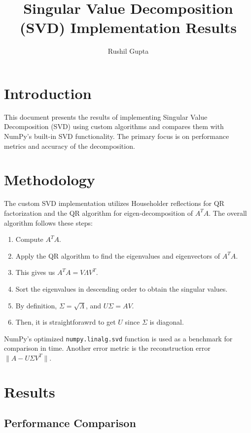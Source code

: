 \documentclass[a4paper, 12pt]{article}
\title{\Large\textbf{Singular Value Decomposition (SVD) Implementation Results}}
\author{Rushil Gupta}
\date{}
\begin{document}
\maketitle

\section*{Introduction}

This document presents the results of implementing Singular Value Decomposition (SVD) using custom algorithms and compares them with NumPy's built-in SVD functionality. The primary focus is on performance metrics and accuracy of the decomposition.

\section*{Methodology}

The custom SVD implementation utilizes Householder reflections for QR factorization and the QR algorithm for eigen-decomposition of $A^T A$. The overall algorithm follows these steps:

\begin{enumerate}
    \item Compute $A^T A$.
    \item Apply the QR algorithm to find the eigenvalues and eigenvectors of $A^T A$.
    \item This gives us $A^T A = V \Lambda V^T$.
    \item Sort the eigenvalues in descending order to obtain the singular values.
    \item By definition, $\Sigma = \sqrt{\Lambda}$, and $U\Sigma = A V$.
    \item Then, it is straightforawrd to get $U$ since $\Sigma$ is diagonal.
\end{enumerate}

NumPy's optimized \texttt{numpy.linalg.svd} function is used as a benchmark for comparison in time. Another error metric is the reconstruction error $\| A - U \Sigma V^T \|$.

\section*{Results}

\subsection*{Performance Comparison}
\end{document}
